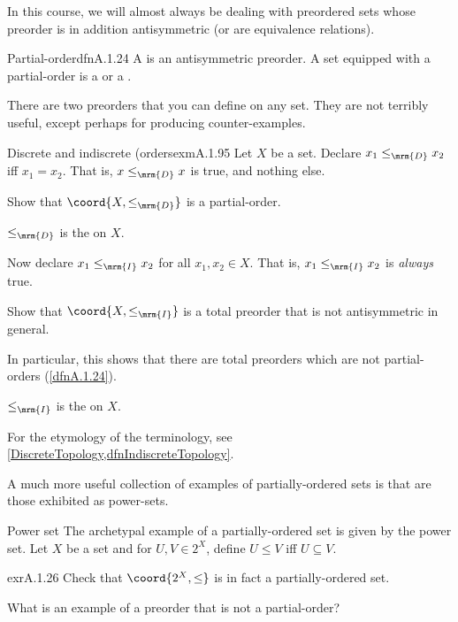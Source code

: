 In this course, we will almost always be dealing with preordered sets whose preorder is in addition antisymmetric (or are equivalence relations).
\begin{dfn}{Partial-order}{dfnA.1.24}
A  is an antisymmetric preorder.  A set equipped with a partial-order is a  or a .
\end{dfn}
There are two preorders that you can define on any set.  They are not terribly useful, except perhaps for producing counter-examples.
\begin{exm}{Discrete and indiscrete (orders}{exmA.1.95}
	Let $X$ be a set.  Declare $x_1\leq _{\mrm{D}}x_2$ iff $x_1=x_2$.  That is, $x\leq _{\mrm{D}}x$ is true, and nothing else.
	\begin{exr}[breakable=false]{}{}
		Show that $\coord{X,\leq _{\mrm{D}}}$ is a partial-order.
		\begin{rmk}
			$\leq _{\mrm{D}}$ is the  on $X$.
		\end{rmk}
	\end{exr}
	
	Now declare $x_1\leq _{\mrm{I}}x_2$ for all $x_1,x_2\in X$.  That is, $x_1\leq _{\mrm{I}}x_2$ is \emph{always} true.
	\begin{exr}[breakable=false]{}{}
		Show that $\coord{X,\leq _{\mrm{I}}}$ is a total preorder that is not antisymmetric in general.
		\begin{rmk}
			In particular, this shows that there are total preorders which are not partial-orders (\cref{dfnA.1.24}).
		\end{rmk}
		\begin{rmk}
			$\leq _{\mrm{I}}$ is the  on $X$.
		\end{rmk}
	\end{exr}
	\begin{rmk}
		For the etymology of the terminology, see \cref{DiscreteTopology,dfnIndiscreteTopology}.
	\end{rmk}
\end{exm}
A much more useful collection of examples of partially-ordered sets is that are those exhibited as power-sets.
\begin{exm}{Power set}{}
The archetypal example of a partially-ordered set is given by the power set.  Let $X$ be a set and for $U,V\in 2^X$, define $U\leq V$ iff $U\subseteq V$.
\begin{exr}[breakable=false]{}{exrA.1.26}
Check that $\coord{2^X,\leq}$ is in fact a partially-ordered set.
\end{exr}
\end{exm}
\begin{exr}{}{}
What is an example of a preorder that is not a partial-order?
\end{exr}

